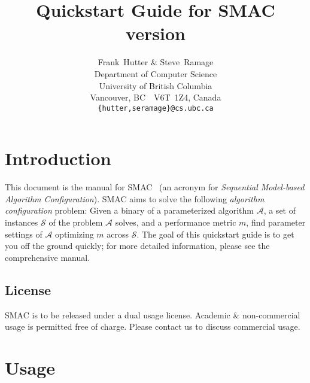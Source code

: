 \documentclass[11pt,letterpaper,twoside]{article}
\begin{document}
\title{Quickstart Guide for SMAC version  }

\author{
Frank~Hutter \& Steve~Ramage\\
Department of Computer Science\\
University of British Columbia\\
Vancouver, BC\ \ V6T~1Z4, Canada\\
\texttt{\{hutter,seramage\}@cs.ubc.ca}
}

%
\newcommand{\version}{VERSION}
\maketitle

\section{Introduction}

This document is the manual for SMAC~\cite{HutHooLey11-SMAC} (an acronym for \emph{Sequential Model-based Algorithm Configuration}). SMAC aims to solve the following \emph{algorithm configuration} problem: Given a binary of a parameterized algorithm $\mathcal{A}$, a set of instances $\mathcal{S}$ of the problem $\mathcal{A}$ solves, and a performance metric $m$, find parameter settings of $\mathcal{A}$ optimizing $m$ across $\mathcal{S}$.
The goal of this quickstart guide is to get you off the ground quickly; for more detailed information, please see the comprehensive manual.

\subsection{License}

SMAC is to be released under a dual usage license. 
Academic \& non-commercial usage is permitted free of charge. Please contact us to discuss commercial usage.

\section {Usage}
\end{document}
